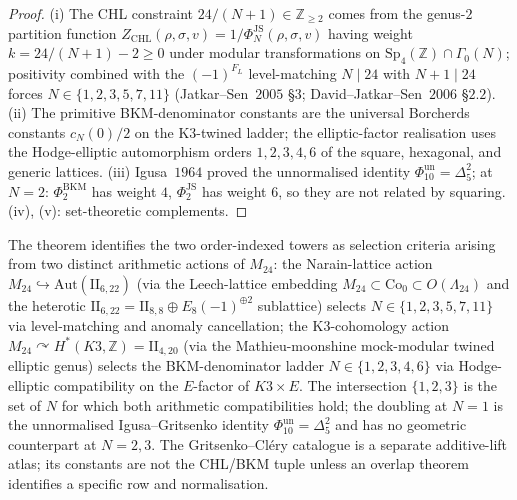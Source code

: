 \begin{proof}
(i) The CHL constraint $24/(N + 1) \in \mathbb{Z}_{\geq 2}$ comes from the genus-$2$ partition function $Z_{\mathrm{CHL}}(\rho, \sigma, v) = 1/\Phi_N^{\mathrm{JS}}(\rho, \sigma, v)$ having weight $k = 24/(N + 1) - 2 \geq 0$ under modular transformations on $\mathrm{Sp}_4(\mathbb{Z}) \cap \Gamma_0(N)$; positivity combined with the $(-1)^{F_L}$ level-matching $N \mid 24$ with $N + 1 \mid 24$ forces $N \in \{1, 2, 3, 5, 7, 11\}$ (Jatkar--Sen~$2005$ \S$3$; David--Jatkar--Sen~$2006$ \S$2.2$). (ii) The primitive BKM-denominator constants are the universal Borcherds constants $c_N(0)/2$ on the K3-twined ladder; the elliptic-factor realisation uses the Hodge-elliptic automorphism orders $1,2,3,4,6$ of the square, hexagonal, and generic lattices. (iii) Igusa~$1964$ proved the unnormalised identity \(\Phi_{10}^{\mathrm{un}}=\Delta_5^2\); at $N = 2$: $\Phi_2^{\mathrm{BKM}}$ has weight $4$, $\Phi_2^{\mathrm{JS}}$ has weight $6$, so they are not related by squaring. (iv), (v): set-theoretic complements.
\end{proof}

\begin{remark}
\label{rem:k3e-two-m24-actions}
The theorem identifies the two order-indexed towers as selection criteria arising from two distinct arithmetic actions of $M_{24}$: the Narain-lattice action $M_{24} \hookrightarrow \mathrm{Aut}(\mathrm{II}_{6, 22})$ (via the Leech-lattice embedding $M_{24} \subset \mathrm{Co}_0 \subset O(\Lambda_{24})$ and the heterotic $\mathrm{II}_{6, 22} = \mathrm{II}_{8, 8} \oplus E_8(-1)^{\oplus 2}$ sublattice) selects $N \in \{1, 2, 3, 5, 7, 11\}$ via level-matching and anomaly cancellation; the K3-cohomology action $M_{24} \curvearrowright H^*(K3, \mathbb{Z}) = \mathrm{II}_{4, 20}$ (via the Mathieu-moonshine mock-modular twined elliptic genus) selects the BKM-denominator ladder $N \in \{1, 2, 3, 4, 6\}$ via Hodge-elliptic compatibility on the $E$-factor of $K3 \times E$. The intersection $\{1, 2, 3\}$ is the set of $N$ for which both arithmetic compatibilities hold; the doubling at $N = 1$ is the unnormalised Igusa--Gritsenko identity \(\Phi_{10}^{\mathrm{un}}=\Delta_5^2\) and has no geometric counterpart at $N = 2, 3$. The Gritsenko--Cl\'ery catalogue is a separate additive-lift atlas; its constants are not the CHL/BKM tuple unless an overlap theorem identifies a specific row and normalisation.
\end{remark}

